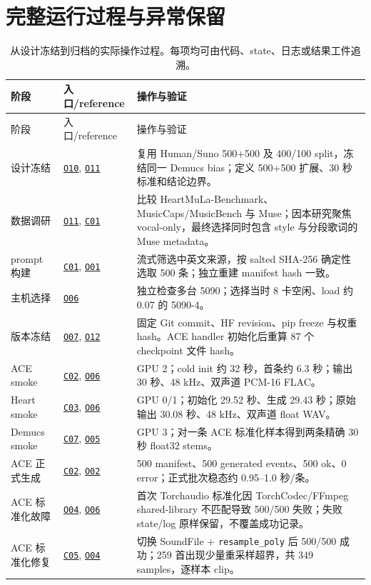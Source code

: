 \documentclass[UTF8,11pt,a4paper,fontset=none]{ctexart}
\newcommand{\coderef}[1]{\hyperlink{code:#1}{\texttt{#1}}}
\newcommand{\outref}[1]{\hyperlink{output:#1}{\texttt{#1}}}
\begin{document}
\section{完整运行过程与异常保留}
\label{sec:operations}

\begin{longtable}{p{20mm}p{38mm}p{86mm}}
\caption{从设计冻结到归档的实际操作过程。每项均可由代码、state、日志或结果工件追溯。}
\label{tab:timeline}\\
\toprule
阶段 & 入口/reference & 操作与验证 \\
\midrule
\endfirsthead
\toprule
阶段 & 入口/reference & 操作与验证 \\
\midrule
\endhead
设计冻结 & \outref{O10}, \outref{O11} & 复用 Human/Suno 500+500 及 400/100 split，冻结同一 Demucs bias；定义 500+500 扩展、30 秒标准和结论边界。 \\
数据调研 & \outref{O11}, \coderef{C01} & 比较 HeartMuLa-Benchmark、MusicCaps/MusicBench 与 Muse；因本研究聚焦 vocal-only，最终选择同时包含 style 与分段歌词的 Muse metadata。 \\
prompt 构建 & \coderef{C01}, \outref{O01} & 流式筛选中英文来源，按 salted SHA-256 确定性选取 500 条；独立重建 manifest hash 一致。 \\
主机选择 & \outref{O06} & 独立检查多台 5090；选择当时 8 卡空闲、load 约 0.07 的 5090-4。 \\
版本冻结 & \outref{O07}, \outref{O12} & 固定 Git commit、HF revision、pip freeze 与权重 hash。ACE handler 初始化后重算 87 个 checkpoint 文件 hash。 \\
ACE smoke & \coderef{C02}, \outref{O06} & GPU 2；cold init 约 32 秒，首条约 6.3 秒；输出 30 秒、48 kHz、双声道 PCM-16 FLAC。 \\
Heart smoke & \coderef{C03}, \outref{O06} & GPU 0/1；初始化 29.52 秒、生成 29.43 秒；原始输出 30.08 秒、48 kHz、双声道 float WAV。 \\
Demucs smoke & \coderef{C07}, \outref{O05} & GPU 3；对一条 ACE 标准化样本得到两条精确 30 秒 float32 stems。 \\
ACE 正式生成 & \coderef{C02}, \outref{O02} & 500 manifest、500 generated events、500 ok、0 error；正式批次稳态约 0.95--1.0 秒/条。 \\
ACE 标准化故障 & \outref{O04}, \outref{O06} & 首次 Torchaudio 标准化因 TorchCodec/FFmpeg shared-library 不匹配导致 500/500 失败；失败 state/log 原样保留，不覆盖成功记录。 \\
ACE 标准化修复 & \coderef{C05}, \outref{O04} & 切换 SoundFile + \texttt{resample\_poly} 后 500/500 成功；259 首出现少量重采样超界，共 349 samples，逐样本 clip。 \\

\end{longtable}
\end{document}
